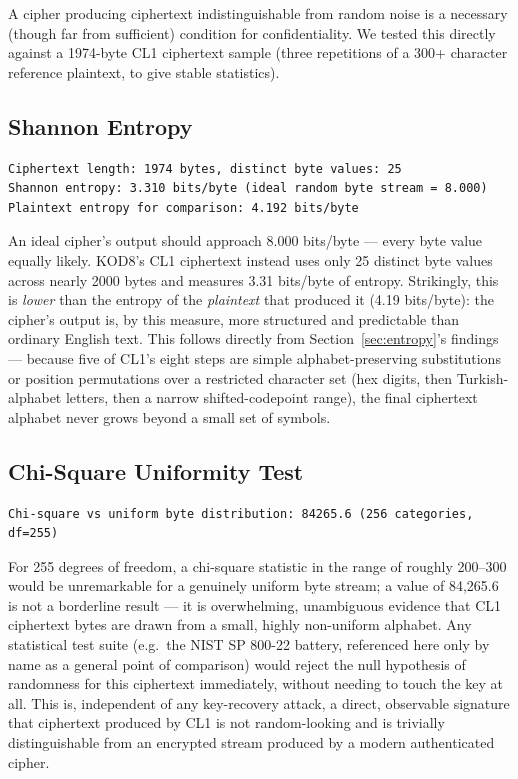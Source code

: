 \documentclass[11pt]{article}
\begin{document}
A cipher producing ciphertext indistinguishable from random noise is a
necessary (though far from sufficient) condition for confidentiality.
We tested this directly against a 1974-byte CL1 ciphertext sample
(three repetitions of a 300+ character reference plaintext, to give
stable statistics).

\subsection{Shannon Entropy}

\begin{lstlisting}
Ciphertext length: 1974 bytes, distinct byte values: 25
Shannon entropy: 3.310 bits/byte (ideal random byte stream = 8.000)
Plaintext entropy for comparison: 4.192 bits/byte
\end{lstlisting}

An ideal cipher's output should approach 8.000 bits/byte --- every byte
value equally likely. KOD8's CL1 ciphertext instead uses only 25
distinct byte values across nearly 2000 bytes and measures 3.31
bits/byte of entropy. Strikingly, this is \emph{lower} than the
entropy of the \emph{plaintext} that produced it (4.19 bits/byte): the
cipher's output is, by this measure, more structured and predictable
than ordinary English text. This follows directly from
Section~\ref{sec:entropy}'s findings --- because five of CL1's eight
steps are simple alphabet-preserving substitutions or position
permutations over a restricted character set (hex digits, then
Turkish-alphabet letters, then a narrow shifted-codepoint range), the
final ciphertext alphabet never grows beyond a small set of symbols.

\subsection{Chi-Square Uniformity Test}

\begin{lstlisting}
Chi-square vs uniform byte distribution: 84265.6 (256 categories, df=255)
\end{lstlisting}

For 255 degrees of freedom, a chi-square statistic in the range of
roughly 200–300 would be unremarkable for a genuinely uniform byte
stream; a value of 84{,}265.6 is not a borderline result --- it is
overwhelming, unambiguous evidence that CL1 ciphertext bytes are
drawn from a small, highly non-uniform alphabet. Any statistical test
suite (e.g.\ the NIST SP 800-22 battery, referenced here only by name
as a general point of comparison) would reject the null hypothesis of
randomness for this ciphertext immediately, without needing to touch
the key at all. This is, independent of any key-recovery attack, a
direct, observable signature that ciphertext produced by CL1 is not
random-looking and is trivially distinguishable from an encrypted
stream produced by a modern authenticated cipher.
\end{document}
